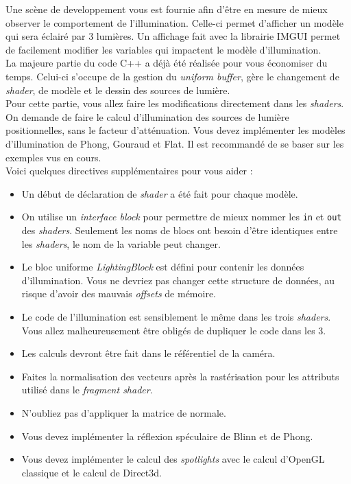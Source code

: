 \documentclass{article}[letterpaper, 11pt]
\begin{document}
Une scène de developpement vous est fournie afin d'être en mesure de mieux observer le comportement de l'illumination.
Celle-ci permet d'afficher un modèle qui sera éclairé par 3 lumières. Un affichage fait avec la librairie IMGUI permet de facilement modifier les variables qui impactent le modèle d'illumination.\vspace*{11pt}
\\
La majeure partie du code C++ a déjà été réalisée pour vous économiser du temps. Celui-ci s'occupe de la gestion du \textit{uniform buffer}, gère le changement de \textit{shader}, de modèle et le dessin des sources de lumière.\vspace*{11pt}
\\
Pour cette partie, vous allez faire les modifications directement dans les \textit{shaders}. On demande de faire le calcul d'illumination des sources de lumière positionnelles, sans le facteur d'atténuation.
Vous devez implémenter les modèles d'illumination de Phong, Gouraud et Flat. Il est recommandé de se baser sur les exemples vus en cours.\vspace*{11pt}
\\
Voici quelques directives supplémentaires pour vous aider :
\begin{itemize}[label={--}]
	\item Un début de déclaration de \textit{shader} a été fait pour chaque modèle.
	\item On utilise un \textit{interface block} pour permettre de mieux nommer les \texttt{in} et \texttt{out} des \textit{shaders}.
	Seulement les noms de blocs ont besoin d'être identiques entre les \textit{shaders}, le nom de la variable peut changer.
	\item Le bloc uniforme \textit{LightingBlock} est défini pour contenir les données d'illumination. Vous ne devriez pas changer cette structure de données, au risque d'avoir des mauvais \textit{offsets} de mémoire.
	\item Le code de l'illumination est sensiblement le même dans les trois \textit{shaders}. Vous allez malheureusement être obligés de dupliquer le code dans les 3.
	\item Les calculs devront être fait dans le référentiel de la caméra.
	\item Faites la normalisation des vecteurs après la rastérisation pour les attributs utilisé dans le \textit{fragment shader}.
	\item N'oubliez pas d'appliquer la matrice de normale.
	\item Vous devez implémenter la réflexion spéculaire de Blinn et de Phong.
	\item Vous devez implémenter le calcul des \textit{spotlights} avec le calcul d'OpenGL classique et le calcul de Direct3d.
\end{itemize}
\end{document}
